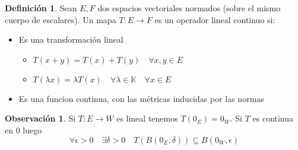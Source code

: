 \documentclass[12pt]{article}
\newcommand{\K}{\mathbb{K}}
\newcommand{\ra}{\rightarrow}
\theoremstyle{definition}
\newtheorem{definition}{Definición}[section]
\newtheorem*{remark}{Observación}
\begin{document}
\begin{definition}
	Sean $E,F$ dos espacios vectoriales normados (sobre el mismo cuerpo de escalares). Un mapa $T:E \ra F$ es un operador lineal continuo si:
	\begin{itemize}
		\item Es una transformación lineal
			\begin{itemize}
				\item $T(x+y) = T(x) + T(y) \quad \forall x,y \in E$
				\item $T(\lambda x) = \lambda T(x) \quad \forall \lambda \in \K \quad \forall x \in E$
			\end{itemize}

		\item Es una funcion continua, con las métricas inducidas por las normas

	\end{itemize}
\end{definition}

\begin{remark}
  Si $T:E \ra W$ es lineal tenemos $T(0_{E}) = 0_{W}$. Si $T$ es continua en 0 luego $$\forall \epsilon > 0 \quad \exists \delta > 0 \quad  T(B(0_{E},\delta))  \subseteq B(0_{W},\epsilon) $$
\end{remark}
\end{document}
